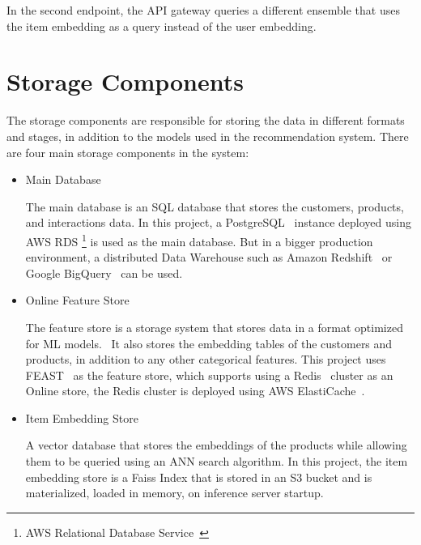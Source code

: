 In the second endpoint, the API gateway queries a different ensemble that uses the item embedding as a query instead of the user embedding.

\section{Storage Components}

The storage components are responsible for storing the data in different formats and stages, in addition to the models used in the recommendation system.
There are four main storage components in the system:

\begin{itemize}
    \item Main Database
    \begin{displayquote}
        The main database is an SQL database that stores the customers, products, and
         interactions data. In this project, a PostgreSQL~\cite{Postgres} instance 
         deployed using AWS RDS \footnote{AWS Relational Database Service~\cite{AwsRDS}}
         is used as the main database. 
         But in a bigger production environment, a distributed Data Warehouse such as 
         Amazon Redshift~\cite{AwsRedshift} or Google BigQuery~\cite{GoogleBigQuery} can be used.
    \end{displayquote}
    \item Online Feature Store
    \begin{displayquote}
        The feature store is a storage system that stores data in a format optimized for ML models.~\cite{NvidiaFeatureStores}
        It also stores the embedding tables of the customers 
        and products, in addition to any other categorical features.
        This project uses FEAST~\cite{feast} as the feature store, which supports using a Redis~\cite{Redis} 
        cluster as an Online store, the Redis cluster is deployed using AWS ElastiCache~\cite{AwsElastiCache}.
    \end{displayquote}

    \item Item Embedding Store
    \begin{displayquote}
        A vector database that stores the embeddings of the products
        while allowing them to be queried using an ANN search algorithm. 
        In this project, the item embedding store is a Faiss Index\cite{Faiss} that is stored in an S3 bucket and is materialized, loaded in memory, on inference server startup.
    \end{displayquote}


\end{itemize}
